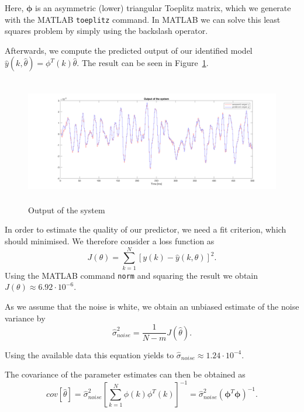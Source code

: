 \documentclass{scrartcl}
\begin{document}
Here, $\pmb{\phi}$ is an asymmetric (lower) triangular Toeplitz matrix, which we generate with the MATLAB \texttt{toeplitz} command.
In MATLAB we can solve this least squares problem by simply using the backslash operator. 

Afterwards, we compute the predicted output of our identified model $\hat{y} (k,\hat{\theta}) = \phi^{T} (k) \hat{\theta}$. The result can be seen in Figure~\ref{fig:output}.

\begin{figure}[h]
	\centering
	\includegraphics[height=5.5cm]{figures/output.png}
	\caption{Output of the system}\label{fig:output}
\end{figure}

In order to estimate the quality of our predictor, we need a fit criterion, which should minimised. We therefore consider a loss function as 
\begin{equation}\label{eq:J}
	J(\theta) = \sum\limits_{k=1}^N \left[y(k) - \hat{y}(k,\theta) \right]^2.
\end{equation}
Using the MATLAB command \texttt{norm} and squaring the result we obtain $ J(\theta) \approx 6.92 \cdot 10^{-6}$. 

As we assume that the noise is white, we obtain an unbiased estimate of the noise variance by
\begin{equation}\label{eq:sigma}
	\hat{\sigma}_{noise}^{2} = \frac{1}{N-m} J(\hat{\theta}) .
\end{equation}

Using the available data this equation yields to $ \hat{\sigma}_{noise} \approx 1.24 \cdot 10^{-4} $.

The covariance of the parameter estimates can then be obtained as
\begin{equation}\label{eq:cov}
	cov[\hat{\theta}] = \hat{\sigma}_{noise}^2 \left[ \sum\limits_{k=1}^N \phi(k)\phi^T(k) \right]^{-1} = \hat{\sigma}_{noise}^2 \left( \pmb{\phi}^T \pmb{\phi} \right)^{-1} .
\end{equation}
\end{document}
